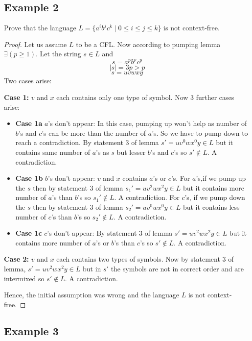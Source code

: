 \documentclass{article}
\begin{document}
\subsection{Example 2}

Prove that the language $L=\{a^ib^jc^k\mid 0\le i\le j \le k\}$ is not context-free.

\begin{proof}
Let us assume $L$ to be a CFL. Now according to pumping lemma $\exists(p\ge1)$.
Let the string $s\in L$ and $$s=a^pb^pc^p$$ $$\mid s\mid=3p>p $$ $$s=uvwxy$$
Two cases arise:

\textbf{Case 1:} $v$ and $x$ each contains only one type of symbol.
Now 3 further cases arise:
\begin{itemize}
    \item \textbf{Case 1a } $a$'s don't appear: In this case, pumping up won't help as number of $b$'s and $c$'s can be more than the number of $a$'s. So we have to pump down to reach a contradiction. By statement 3 of lemma $s'=uv^0wx^0y \in L$ but it contains same number of $a$'s as $s$ but lesser $b$'s and $c$'s so $s'\notin L$. A contradiction. 
    
    \item \textbf{Case 1b } $b$'s don't appear: $v$ and $x$ contains $a$'s or $c$'s. For $a$'s,if we pump up the $s$ then by statement 3 of lemma $s_1'=uv^2wx^2y \in L$ but it contains more number of $a$'s than $b$'s so $s_1'\notin L$. A contradiction.  For $c$'s, if we pump down the $s$ then by statement 3 of lemma $s_2'=uv^0wx^0y \in L$ but it contains less number of $c$'s than $b$'s so $s_2'\notin L$. A contradiction.
    
    \item \textbf{Case 1c } $c$'s don't appear: By statement 3 of lemma $s'=uv^2wx^2y \in L$ but it contains more number of $a$'s or $b$'s than $c$'s so $s'\notin L$. A contradiction. 
    
\end{itemize}

\textbf{Case 2:} $v$ and $x$ each contains two types of symbols.
Now by statement 3 of lemma, $s'=uv^2wx^2y\in L$ but in $s'$ the symbols are not in correct order and are intermixed so $s'\notin L$. A contradiction.

Hence, the initial assumption was wrong and the language $L$ is not context-free.
\end{proof}

\subsection{Example 3}
\end{document}

